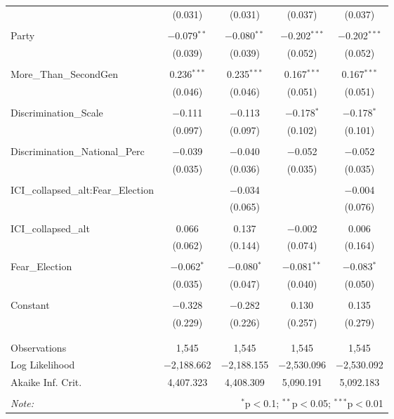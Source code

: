 \begin{table}[!htbp]
\begin{tabular}{@{\extracolsep{5pt}}lcccc}
  & (0.031) & (0.031) & (0.037) & (0.037) \\ 
  & & & & \\ 
 Party & $-$0.079$^{**}$ & $-$0.080$^{**}$ & $-$0.202$^{***}$ & $-$0.202$^{***}$ \\ 
  & (0.039) & (0.039) & (0.052) & (0.052) \\ 
  & & & & \\ 
 More\_Than\_SecondGen & 0.236$^{***}$ & 0.235$^{***}$ & 0.167$^{***}$ & 0.167$^{***}$ \\ 
  & (0.046) & (0.046) & (0.051) & (0.051) \\ 
  & & & & \\ 
 Discrimination\_Scale & $-$0.111 & $-$0.113 & $-$0.178$^{*}$ & $-$0.178$^{*}$ \\ 
  & (0.097) & (0.097) & (0.102) & (0.101) \\ 
  & & & & \\ 
 Discrimination\_National\_Perc & $-$0.039 & $-$0.040 & $-$0.052 & $-$0.052 \\ 
  & (0.035) & (0.036) & (0.035) & (0.035) \\ 
  & & & & \\ 
 ICI\_collapsed\_alt:Fear\_Election &  & $-$0.034 &  & $-$0.004 \\ 
  &  & (0.065) &  & (0.076) \\ 
  & & & & \\ 
 ICI\_collapsed\_alt & 0.066 & 0.137 & $-$0.002 & 0.006 \\ 
  & (0.062) & (0.144) & (0.074) & (0.164) \\ 
  & & & & \\ 
 Fear\_Election & $-$0.062$^{*}$ & $-$0.080$^{*}$ & $-$0.081$^{**}$ & $-$0.083$^{*}$ \\ 
  & (0.035) & (0.047) & (0.040) & (0.050) \\ 
  & & & & \\ 
 Constant & $-$0.328 & $-$0.282 & 0.130 & 0.135 \\ 
  & (0.229) & (0.226) & (0.257) & (0.279) \\ 
  & & & & \\ 
\hline \\[-1.8ex] 
Observations & 1,545 & 1,545 & 1,545 & 1,545 \\ 
Log Likelihood & $-$2,188.662 & $-$2,188.155 & $-$2,530.096 & $-$2,530.092 \\ 
Akaike Inf. Crit. & 4,407.323 & 4,408.309 & 5,090.191 & 5,092.183 \\ 
\hline 
\hline \\[-1.8ex] 
\textit{Note:}  & \multicolumn{4}{r}{$^{*}$p$<$0.1; $^{**}$p$<$0.05; $^{***}$p$<$0.01} \\ 
\end{tabular} 
\end{table} 
